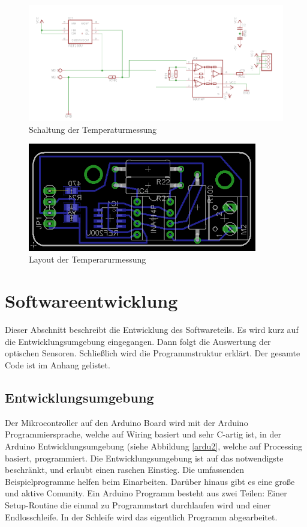 \documentclass[a4paper,bibtotoc,oneside]{scrbook}
\begin{document}
\begin{figure}[htbp]
\centering
\includegraphics[width=125mm]{img/tmess.png}
\caption{Schaltung der Temperaturmessung}\label{tmess}
\end{figure}

\begin{figure}[htbp]
\centering
\includegraphics[width=100mm]{img/tmess2.png}
\caption[Arduino Mega 2560]{Layout der Temperarurmessung}\label{tmess2}
\end{figure}


\section{Softwareentwicklung}\thispagestyle{empty}
Dieser Abschnitt beschreibt die Entwicklung des Softwareteils. Es wird kurz auf die Entwicklungsumgebung eingegangen. Dann folgt die Auswertung der optischen Sensoren. Schließlich wird die Programmstruktur erklärt. Der gesamte Code ist im Anhang gelistet.

\subsection{Entwicklungsumgebung}\thispagestyle{empty}
Der Mikrocontroller auf den Arduino Board wird mit der Arduino Programmiersprache, welche auf Wiring basiert und sehr C-artig ist, in der Arduino Entwicklungsumgebung (siehe Abbildung \ref{ardu2}, welche auf Processing basiert, programmiert. Die Entwicklungsumgebung ist auf das notwendigste beschränkt, und erlaubt einen raschen Einstieg. Die umfassenden Beispielprogramme helfen beim Einarbeiten. Darüber hinaus gibt es eine große und aktive Comunity.
Ein Arduino Programm besteht aus zwei Teilen: Einer Setup-Routine die einmal zu Programmstart durchlaufen wird und einer Endlosschleife. In der Schleife wird das eigentlich Programm abgearbeitet. 
\end{document}
